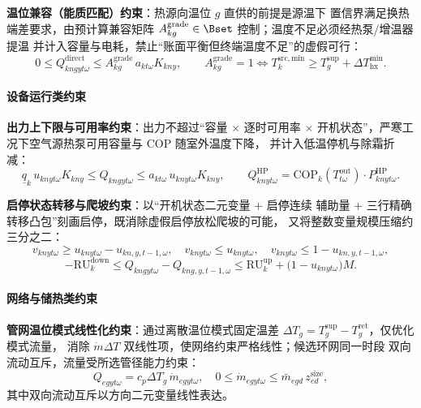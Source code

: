 \textbf{温位兼容（能质匹配）约束}：热源向温位 $g$ 直供的前提是源温下
置信界满足换热端差要求，由预计算兼容矩阵
$A^{\mathrm{grade}}_{kg}\in\Bset$ 控制；温度不足必须经热泵/增温器提温
并计入容量与电耗，禁止“账面平衡但终端温度不足”的虚假可行：
\begin{equation}
\label{eq:grade}
0\le Q^{\mathrm{direct}}_{kngyt\omega}
\le A^{\mathrm{grade}}_{kg}\,a_{kt\omega}K_{kny},
\qquad
A^{\mathrm{grade}}_{kg}=1\iff
T^{\mathrm{src,min}}_{k}\ge T^{\mathrm{sup}}_{g}
+\Delta T^{\mathrm{min}}_{\mathrm{hx}}.
\end{equation}

\paragraph{设备运行类约束}

\textbf{出力上下限与可用率约束}：出力不超过“容量 $\times$ 逐时可用率
$\times$ 开机状态”，严寒工况下空气源热泵可用容量与 COP 随室外温度下降，
并计入低温停机与除霜折减：
\begin{equation}
\label{eq:output}
\underline{q}_{k}\,u_{knyt\omega}K_{kny}
\le Q_{kngyt\omega}
\le a_{kt\omega}\,u_{knyt\omega}K_{kny},
\qquad
Q^{\mathrm{HP}}_{knyt\omega}
=\mathrm{COP}_{k}(T^{\mathrm{out}}_{t\omega})\cdot
P^{\mathrm{HP}}_{knyt\omega}.
\end{equation}

\textbf{启停状态转移与爬坡约束}：以“开机状态二元变量 $+$ 启停连续
辅助量 $+$ 三行精确转移凸包”刻画启停，既消除虚假启停放松爬坡的可能，
又将整数变量规模压缩约三分之二：
\begin{equation}
\label{eq:uc}
v_{knyt\omega}\ge u_{knyt\omega}-u_{kn,y,t-1,\omega},\quad
v_{knyt\omega}\le u_{knyt\omega},\quad
v_{knyt\omega}\le 1-u_{kn,y,t-1,\omega},
\end{equation}
\begin{equation}
\label{eq:ramp}
-\mathrm{RU}^{\mathrm{down}}_{k}\le
Q_{kngyt\omega}-Q_{kng,y,t-1,\omega}
\le \mathrm{RU}^{\mathrm{up}}_{k}
+\bigl(1-u_{knyt\omega}\bigr)M.
\end{equation}

\paragraph{网络与储热类约束}

\textbf{管网温位模式线性化约束}：通过离散温位模式固定温差
$\Delta T_g=T^{\mathrm{sup}}_g-T^{\mathrm{ret}}_g$，仅优化模式流量，
消除 $\dot m\Delta T$ 双线性项，使网络约束严格线性；候选环网同一时段
双向流动互斥，流量受所选管径能力约束：
\begin{equation}
\label{eq:pipe}
Q_{egyt\omega}=c_p\Delta T_g\,\dot m_{egyt\omega},\quad
0\le\dot m_{egyt\omega}\le\bar m_{egd}\,z^{\mathrm{size}}_{ed},
\end{equation}
\noindent 其中双向流动互斥以方向二元变量线性表达。

